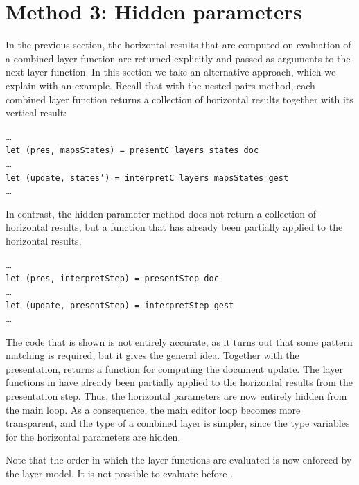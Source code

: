 \documentclass[preprint,natbib]{sigplanconf}
\begin{document}
%																
%																
%																
\section{Method 3: Hidden parameters} \label{sect:hidden}

 
In the previous section, the horizontal results that are computed on evaluation of a combined layer function are returned explicitly and passed as arguments to the next layer function. In this section we take an alternative approach, which we explain with an example.  Recall that with the nested pairs method, each combined layer function returns a collection of horizontal results together with its vertical result:

\dots\\
{\tt  let (pres, mapsStates) = presentC layers states doc }\\
\dots\\
{\tt let (update, states') = interpretC layers mapsStates gest}\\
\dots

In contrast, the hidden parameter method does not return a collection of horizontal results, but a function that has already been partially applied to the horizontal results.

\dots\\
{\tt let (pres, interpretStep) = presentStep doc}\\
\dots\\
{\tt let (update, presentStep) = interpretStep gest}\\
\dots

The code that is shown is not entirely accurate, as it turns out that some pattern matching is required, but it gives the general idea. Together with the presentation,  returns a function  for computing the document update. The layer functions in  have already been partially applied to the horizontal results from the presentation step. Thus, the horizontal parameters are now entirely hidden from the main loop.  As a consequence, the main editor loop becomes more transparent, and the type of a combined layer is simpler, since the type variables for the horizontal parameters are hidden.

\bc Note that the order in which the layer functions are evaluated is now enforced by the layer model. It is not possible to evaluate  before .  \ec
\end{document}
